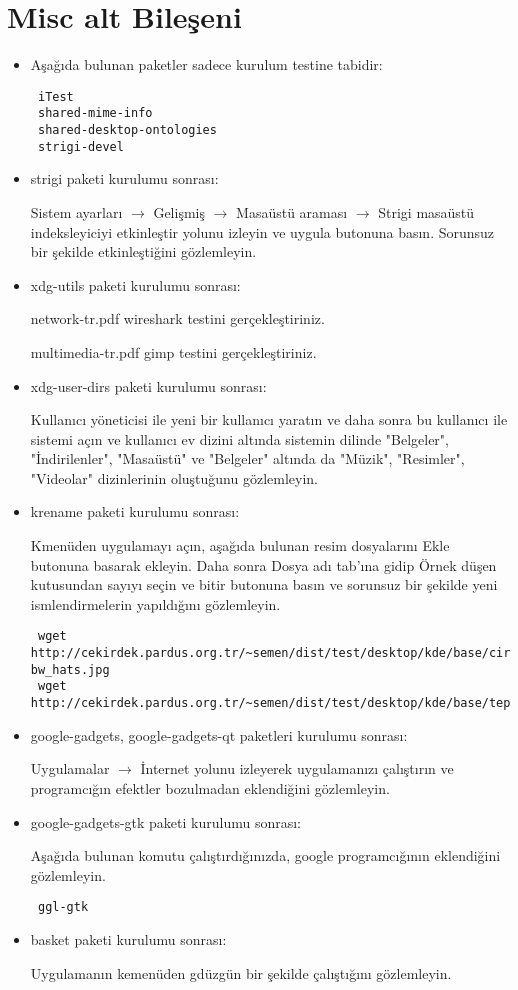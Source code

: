 \documentclass[a4paper,10pt]{article}
\begin{document}
\section{Misc alt Bileşeni}
\begin{itemize}
\item Aşağıda bulunan paketler sadece kurulum testine tabidir:
\begin{verbatim}
 iTest
 shared-mime-info
 shared-desktop-ontologies
 strigi-devel
\end{verbatim}

\item strigi paketi kurulumu sonrası: 

Sistem ayarları $\rightarrow$ Gelişmiş $\rightarrow$ Masaüstü araması $\rightarrow$  Strigi masaüstü indeksleyiciyi etkinleştir yolunu izleyin ve uygula butonuna basın. Sorunsuz bir şekilde etkinleştiğini gözlemleyin.

\item xdg-utils paketi kurulumu sonrası:

network-tr.pdf wireshark testini gerçekleştiriniz.

multimedia-tr.pdf gimp testini gerçekleştiriniz.

\item xdg-user-dirs paketi kurulumu sonrası:

Kullanıcı yöneticisi ile yeni bir kullanıcı yaratın ve daha sonra bu kullanıcı ile sistemi açın ve kullanıcı ev dizini altında sistemin dilinde "Belgeler", "İndirilenler", "Masaüstü" ve "Belgeler" altında da "Müzik", "Resimler", "Videolar" dizinlerinin oluştuğunu gözlemleyin.
\item krename paketi kurulumu sonrası:

Kmenüden uygulamayı açın, aşağıda bulunan resim dosyalarını Ekle butonuna basarak ekleyin. Daha sonra Dosya adı tab'ına gidip Örnek düşen kutusundan sayıyı seçin ve bitir butonuna basın ve sorunsuz bir şekilde yeni ismlendirmelerin yapıldığını gözlemleyin.
\begin{verbatim}
 wget http://cekirdek.pardus.org.tr/~semen/dist/test/desktop/kde/base/circus-bw_hats.jpg
 wget http://cekirdek.pardus.org.tr/~semen/dist/test/desktop/kde/base/tepecik_01.png
\end{verbatim}

\item google-gadgets, google-gadgets-qt  paketleri kurulumu sonrası:

Uygulamalar $\rightarrow$ İnternet yolunu izleyerek uygulamanızı çalıştırın ve programcığın efektler bozulmadan eklendiğini gözlemleyin.

\item google-gadgets-gtk paketi kurulumu sonrası:

Aşağıda bulunan komutu çalıştırdığınızda, google programcığının eklendiğini gözlemleyin.
\begin{verbatim}
 ggl-gtk 
\end{verbatim}

\item basket paketi kurulumu sonrası:

Uygulamanın kemenüden gdüzgün bir şekilde çalıştığını gözlemleyin.

\end{itemize}
\end{document}
